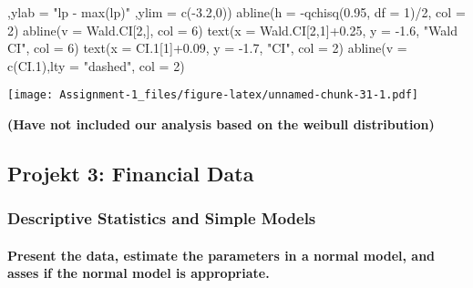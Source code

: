 \documentclass[
]{article}
\newenvironment{Shaded}{\begin{snugshade}}{\end{snugshade}}
\newcommand{\AttributeTok}[1]{\textcolor[rgb]{0.77,0.63,0.00}{#1}}
\newcommand{\DecValTok}[1]{\textcolor[rgb]{0.00,0.00,0.81}{#1}}
\newcommand{\FloatTok}[1]{\textcolor[rgb]{0.00,0.00,0.81}{#1}}
\newcommand{\FunctionTok}[1]{\textcolor[rgb]{0.00,0.00,0.00}{#1}}
\newcommand{\NormalTok}[1]{#1}
\newcommand{\SpecialCharTok}[1]{\textcolor[rgb]{0.00,0.00,0.00}{#1}}
\newcommand{\StringTok}[1]{\textcolor[rgb]{0.31,0.60,0.02}{#1}}
\begin{document}
\begin{Shaded}
\begin{Highlighting}[]
\NormalTok{     ,}\AttributeTok{ylab =} \StringTok{"lp {-} max(lp)"}
\NormalTok{     ,}\AttributeTok{ylim =} \FunctionTok{c}\NormalTok{(}\SpecialCharTok{{-}}\FloatTok{3.2}\NormalTok{,}\DecValTok{0}\NormalTok{))}
\FunctionTok{abline}\NormalTok{(}\AttributeTok{h =} \SpecialCharTok{{-}}\FunctionTok{qchisq}\NormalTok{(}\FloatTok{0.95}\NormalTok{, }\AttributeTok{df =} \DecValTok{1}\NormalTok{)}\SpecialCharTok{/}\DecValTok{2}\NormalTok{, }\AttributeTok{col =} \DecValTok{2}\NormalTok{)}
\FunctionTok{abline}\NormalTok{(}\AttributeTok{v =}\NormalTok{ Wald.CI[}\DecValTok{2}\NormalTok{,], }\AttributeTok{col =} \DecValTok{6}\NormalTok{)}
\FunctionTok{text}\NormalTok{(}\AttributeTok{x =}\NormalTok{ Wald.CI[}\DecValTok{2}\NormalTok{,}\DecValTok{1}\NormalTok{]}\SpecialCharTok{+}\FloatTok{0.25}\NormalTok{, }\AttributeTok{y =} \SpecialCharTok{{-}}\FloatTok{1.6}\NormalTok{, }\StringTok{"Wald CI"}\NormalTok{, }\AttributeTok{col =} \DecValTok{6}\NormalTok{)}
\FunctionTok{text}\NormalTok{(}\AttributeTok{x =}\NormalTok{ CI}\FloatTok{.1}\NormalTok{[}\DecValTok{1}\NormalTok{]}\SpecialCharTok{+}\FloatTok{0.09}\NormalTok{, }\AttributeTok{y =} \SpecialCharTok{{-}}\FloatTok{1.7}\NormalTok{, }\StringTok{"CI"}\NormalTok{, }\AttributeTok{col =} \DecValTok{2}\NormalTok{)}
\FunctionTok{abline}\NormalTok{(}\AttributeTok{v =} \FunctionTok{c}\NormalTok{(CI}\FloatTok{.1}\NormalTok{),}\AttributeTok{lty =} \StringTok{"dashed"}\NormalTok{, }\AttributeTok{col =} \DecValTok{2}\NormalTok{)}
\end{Highlighting}
\end{Shaded}

\texttt{[image: Assignment-1\_files/figure-latex/unnamed-chunk-31-1.pdf]}

\textbf{(Have not included our analysis based on the weibull
distribution)}

\hypertarget{projekt-3-financial-data}{%
\subsection{Projekt 3: Financial Data}\label{projekt-3-financial-data}}

\hypertarget{descriptive-statistics-and-simple-models}{%
\subsubsection{Descriptive Statistics and Simple
Models}\label{descriptive-statistics-and-simple-models}}

\hypertarget{present-the-data-estimate-the-parameters-in-a-normal-model-and-asses-if-the-normal-model-is-appropriate.}{%
\paragraph{Present the data, estimate the parameters in a normal model,
and asses if the normal model is
appropriate.}\label{present-the-data-estimate-the-parameters-in-a-normal-model-and-asses-if-the-normal-model-is-appropriate.}}
\end{document}
